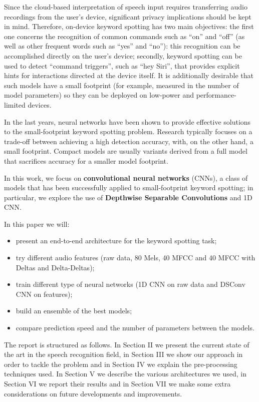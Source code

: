 \documentclass[conference]{IEEEtran}
\begin{document}
Since the cloud-based interpretation of speech input requires transferring audio recordings from the user’s device, significant privacy implications should be kept in mind. Therefore, on-device keyword spotting has two main objectives: the first one concerns the recognition of common commands such as “on” and “off” (as well as other frequent words such as “yes” and “no”): this recognition can be accomplished directly on the user’s device; secondly, keyword spotting can be used to detect “command triggers”, such as “hey Siri”, that provides explicit hints for interactions directed at the device itself. It is additionally desirable that such models have a small footprint (for example, measured in the number of model parameters) so they can be deployed on low-power and performance-limited devices.

In the last years, neural networks have been shown to provide effective solutions to the small-footprint keyword spotting problem. Research typically focuses on a trade-off between achieving a high detection accuracy, with, on the other hand, a small footprint. Compact models are usually variants derived from a full model that sacrifices accuracy for a smaller model footprint.

In this work, we focus on \textbf{convolutional neural networks} (CNNs), a class of models that has been successfully applied to small-footprint keyword spotting; in particular, we explore the use of \textbf{Depthwise Separable Convolutions} and 1D CNN.

In this paper we will: 
\begin{itemize}
\setlength{\itemsep}{0pt}
  \setlength{\parskip}{0pt}
  \setlength{\parsep}{0pt}
\item present an end-to-end architecture for the keyword spotting task;
\item try different audio features (raw data, 80 Mels, 40 MFCC and 40 MFCC with Deltas and Delta-Deltas);
\item train different type of neural networks (1D CNN on raw data and DSConv CNN on features);
\item build an ensemble of the best models;
\item compare prediction speed and the number of parameters between the models.
\end{itemize}

The report is structured as follows. In Section II we present the current state of the art in the speech recognition field, in Section III we show our approach in order to tackle the problem and in Section IV we explain the pre-processing techniques used. In Section V we describe the various architectures we used, in Section VI we report their results and in Section VII we make some extra considerations on future developments and improvements.
\end{document}
